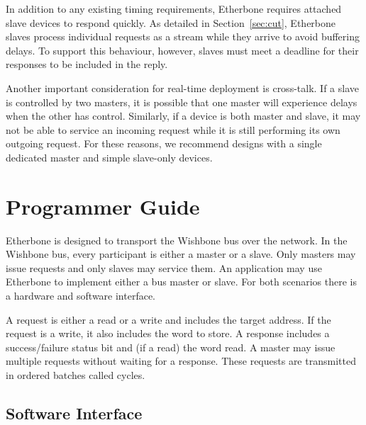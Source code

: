 \documentclass{article}
\begin{document}
In addition to any existing timing requirements, 
Etherbone requires attached slave devices to respond quickly.
As detailed in Section~\ref{sec:cut},
Etherbone slaves process individual requests as a stream while they arrive
to avoid buffering delays.
To support this behaviour, however, 
slaves must meet a deadline 
for their responses to be included in the reply.

Another important consideration for real-time deployment is cross-talk.
If a slave is controlled by two masters, 
it is possible that one master will experience delays when the other has control.
Similarly, if a device is both master and slave,
it may not be able to service an incoming request while it is still
performing its own outgoing request.
For these reasons, 
we recommend designs with a single dedicated master and simple slave-only devices.

\section{Programmer Guide}

Etherbone is designed to transport the Wishbone bus over the network.
In the Wishbone bus, every participant is either a master or a slave.
Only masters may issue requests and only slaves may service them.
An application may use Etherbone to implement either a bus master or slave.
For both scenarios there is a hardware and software interface.

A request is either a read or a write and includes the target address.
If the request is a write, it also includes the word to store.
A response includes a success/failure status bit and (if a read) the word read.
A master may issue multiple requests without waiting for a response.
These requests are transmitted in ordered batches called cycles.


\subsection{Software Interface}
\end{document}

